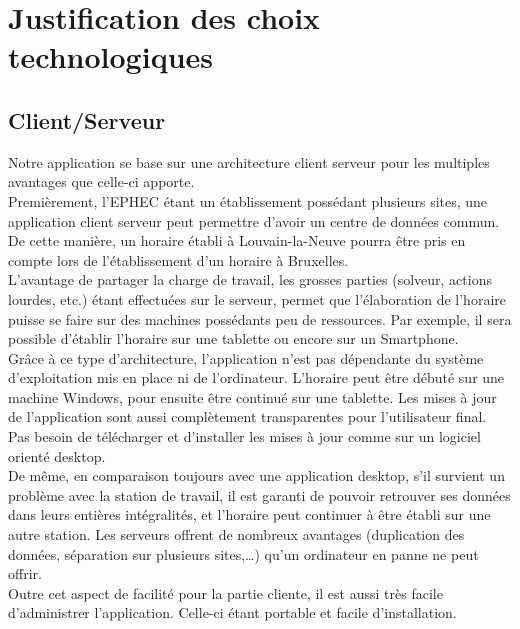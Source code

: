 
\chapter{Justification des choix technologiques}

\section{Client/Serveur}
Notre application se base sur une architecture client serveur pour les multiples
avantages que celle-ci apporte.\\
Premièrement, l'EPHEC étant un établissement possédant plusieurs sites, une application client serveur peut permettre d'avoir un centre de données
 commun.
 De cette manière, un horaire établi à Louvain-la-Neuve pourra être pris en
 compte lors de l'établissement d'un horaire à Bruxelles.\\
L'avantage de partager la charge de travail, les grosses parties (solveur, actions lourdes, etc.) étant
effectuées sur le serveur, permet que l'élaboration de l'horaire puisse se
faire sur des machines possédants peu de ressources. Par exemple, il sera
possible d'établir l'horaire sur une tablette ou encore sur un Smartphone.\\
\newline
\indent
Grâce à ce type d'architecture, l'application n'est pas dépendante du système
d'exploitation mis en place ni de l'ordinateur. L'horaire peut être débuté sur
une machine Windows, pour ensuite être continué sur une tablette.
Les mises à jour de l'application sont aussi complètement transparentes pour
l'utilisateur final. Pas besoin de télécharger et d'installer les mises à jour
comme sur un logiciel orienté desktop.\\
De même, en comparaison toujours avec une application desktop, s'il survient un
problème avec la station de travail, il est garanti de pouvoir retrouver ses
données dans leurs entières intégralités, et l'horaire peut continuer à être établi
sur une autre station. Les serveurs offrent de nombreux avantages (duplication des
données, séparation sur plusieurs sites,…) qu'un ordinateur en panne ne peut offrir.\\
\newline
\indent
Outre cet aspect de facilité pour la partie cliente, il est aussi très facile
d'administrer l'application. Celle-ci étant portable et facile d'installation.
